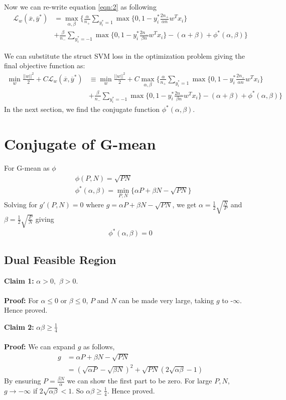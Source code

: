 \documentclass{article} %
\begin{document}
Now we can re-write equation \ref{eqn:2} as following
\begin{align}
\label{eqn:3}
\mathcal L_w(\overline{x},\overline{y}^*) &= \max_{\alpha,\beta}\{
\frac{\alpha}{n_+}\sum_{y_i^*=1}\max\{0,1-y_i^*\frac{2n_+}{\alpha n}w^Tx_i\}\nonumber\\
&+\frac{\beta}{n_-}\sum_{y_i^*=-1}\max\{0,1-y_i^*\frac{2n_-}{\beta n}w^Tx_i\}-(\alpha+\beta)+\phi^*(\alpha,\beta)\}
\end{align}

We can substitute the struct SVM loss in the optimization problem giving the final objective function as:
\begin{equation}
\label{eq:5}
\begin{split}
	\min_w \frac{||w||^2}{2} + C \mathcal L_w(\overline{x},\overline{y}^*)
	&\equiv \min_w \frac{||w||^2}{2} + C\max_{\alpha,\beta}\{
	\frac{\alpha}{n_+}\sum_{y_i^*=1}\max\{0,1-y_i^*\frac{2n_+}{\alpha n}w^Tx_i\}\\
	&+ \frac{\beta}{n_-}\sum_{y_i^*=-1}\max\{0,1-y_i^*\frac{2n_-}{\beta n}w^Tx_i\}-(\alpha+\beta)+\phi^*(\alpha,\beta)\}
\end{split}
\end{equation}
In the next section, we find the conjugate function $\phi^*(\alpha,\beta)$.
\section{Conjugate of G-mean}
For G-mean as $\phi$
\begin{align*}
&\phi(P,N)=\sqrt{PN}\\
&\phi^*(\alpha,\beta) = \min_{P,N}\{\alpha P+\beta N-\sqrt{PN}\}
\end{align*}	
Solving for $g'(P,N)=0$ where $g=\alpha P+\beta N-\sqrt{PN}$, we get $\alpha=\frac{1}{2}\sqrt{\frac{N}{P}}$ and $\beta=\frac{1}{2}\sqrt{\frac{P}{N}}$ giving
\begin{equation}
\phi^*(\alpha,\beta)=0
\end{equation}

\subsection{Dual Feasible Region}
\textbf{Claim 1:} $\alpha > 0,$ $\beta > 0$.\\ \\
\textbf{Proof:} For $\alpha \leq 0$ or $\beta \leq 0$, $P$ and $N$ can be made very large, taking $g$ to -$\infty$. Hence proved.

\textbf{Claim 2:} $\alpha\beta \geq \frac{1}{4}$\\ \\
\textbf{Proof:} We can expand $g$ as follows,
\begin{align*}
g &= \alpha P+\beta N-\sqrt{PN}\\
&=(\sqrt{\alpha P}-\sqrt{\beta N})^2+\sqrt{PN}(2\sqrt{\alpha\beta}-1)
\end{align*}
By ensuring $P=\frac{\beta N}{\alpha}$ we can show the first part to be zero. For large $P,N$, $g \to -\infty$  if $2\sqrt{\alpha\beta}<1$. So $\alpha\beta \geq \frac{1}{4}$. Hence proved.
\end{document}
